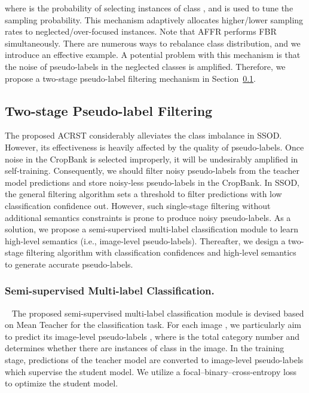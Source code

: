 where  is the probability of selecting instances of class , and  is used to tune the sampling probability. This mechanism adaptively allocates higher/lower sampling rates to neglected/over-focused instances. Note that AFFR performs FBR simultaneously. There are numerous ways to rebalance class distribution, and we introduce an effective example. A potential problem with this mechanism is that the noise of pseudo-labels in the neglected classes is amplified. Therefore, we propose a two-stage pseudo-label filtering mechanism in Section~\ref{3.5}.

\subsection{Two-stage Pseudo-label Filtering}\label{3.5}

The proposed ACRST considerably alleviates the class imbalance in SSOD. However, its effectiveness is heavily affected by the quality of pseudo-labels. Once noise in the CropBank is selected improperly, it will be undesirably amplified in self-training. Consequently, we should filter noisy pseudo-labels from the teacher model predictions and store noisy-less pseudo-labels in the CropBank. In SSOD, the general filtering algorithm sets a threshold  to filter predictions with low classification confidence out. However, such single-stage filtering without additional semantics constraints is prone to produce noisy pseudo-labels. As a solution, we propose a semi-supervised multi-label classification module to learn high-level semantics (i.e., image-level pseudo-labels). Thereafter, we design a two-stage filtering algorithm with classification confidences and high-level semantics to generate accurate pseudo-labels.

\subsubsection{Semi-supervised Multi-label Classification.} 
\ 
\newline
The proposed semi-supervised multi-label classification module is devised based on Mean Teacher for the classification task. For each image , we particularly aim to predict its image-level pseudo-labels , where  is the total category number and  determines whether there are instances of class  in the image. In the training stage, predictions of the teacher model are converted to image-level pseudo-labels which supervise the student model. We utilize a focal–binary–cross-entropy loss to optimize the student model.

